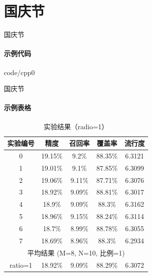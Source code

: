 \documentclass{beamer}
\begin{document}
\section{国庆节}
	\begin{frame}{国庆节}
	\framesubtitle{示例代码}
			
							{code/cpp0}
	\end{frame}
	\begin{frame}{国庆节}
	\framesubtitle{示例表格}
		\begin{table}[h]
		\centering
		\caption{实验结果（radio=1）}
			\begin{tabular}{|c|c|c|c|c|}
			\hline
			实验编号 & 精度 & 召回率 & 覆盖率 & 流行度 \\
			\hline
			0 & 19.15\% & 9.2\% & 88.35\% & 6.3121 \\
			1 & 19.01\% & 9.1\% & 87.85\% & 6.3099 \\
			2 & 19.06\% & 9.11\% & 87.71\% & 6.3076 \\
			3 & 18.92\% & 9.09\% & 88.81\% & 6.3017 \\
			4 & 18.9\% & 9.09\% & 88.3\% & 6.3162 \\
			5 & 18.96\% & 9.15\% & 88.24\% & 6.3114 \\
			6 & 18.7\% & 8.99\% & 88.78\% & 6.3055 \\
			7 & 18.69\% & 8.96\% & 88.3\% & 6.2934 \\
			\hline
			\multicolumn{5}{c}{平均结果 (M=8, N=10, 比例=1)} \\
			\hline
 			ratio=1 & 18.92\% & 9.09\% & 88.29\% & 6.3072 \\
			\hline
			\end{tabular}
		\end{table}
	\end{frame}
	
\end{document}
